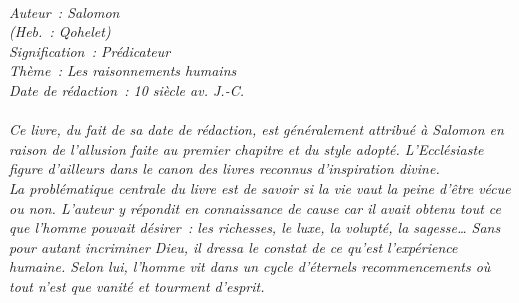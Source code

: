 \BFont
\noindent\hrulefill
{\footnotesize
\textit{
\bigskip
{\centering{}
\\Auteur~: Salomon
\\(Heb.~: Qohelet)
\\Signification~: Prédicateur
\\Thème~: Les raisonnements humains
\\Date de rédaction~: 10 siècle av. J.-C.\\}
}
\textit{
\\Ce livre, du fait de sa date de rédaction, est généralement attribué à Salomon en raison de l'allusion faite au premier chapitre et du style adopté. L'Ecclésiaste figure d'ailleurs dans le canon des livres reconnus d'inspiration divine.
\\La problématique centrale du livre est de savoir si la vie vaut la peine d'être vécue ou non. L'auteur y répondit en connaissance de cause car il avait obtenu tout ce que l'homme pouvait désirer~: les richesses, le luxe, la volupté, la sagesse… Sans pour autant incriminer Dieu, il dressa le constat de ce qu'est l'expérience humaine. Selon lui, l'homme vit dans un cycle d'éternels recommencements où tout n'est que vanité et tourment d'esprit.\bigskip
}
}
\par\nobreak\noindent\hrulefill
